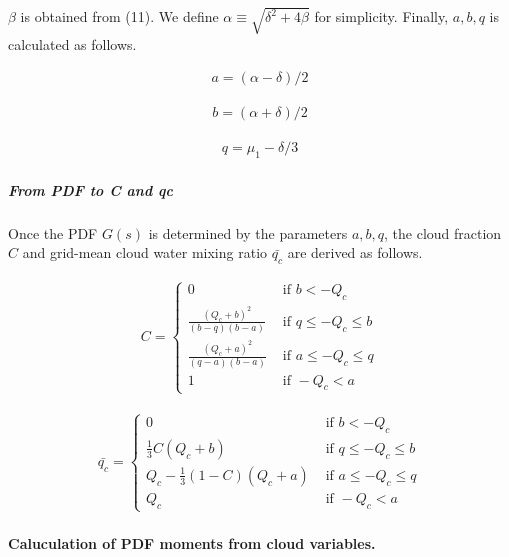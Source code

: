 \(\beta\) is obtained from (11). We define
\(\alpha \equiv\sqrt{\delta^{2}+4 \beta}\) for simplicity. Finally,
\(a,b,q\) is calculated as follows.

\begin{eqnarray}
a=(\alpha-\delta) / 2
\end{eqnarray}

\begin{eqnarray}
b=(\alpha+\delta) / 2
\end{eqnarray}

\begin{eqnarray}
q=\mu_{1}-\delta / 3
\end{eqnarray}

\hypertarget{from-pdf-to-c-and-qc}{%
\subparagraph{From PDF to C and qc}\label{from-pdf-to-c-and-qc}}

Once the PDF \(G(s)\) is determined by the parameters \(a,b,q\), the
cloud fraction \(C\) and grid-mean cloud water mixing ratio
\(\bar{q_c}\) are derived as follows.

\begin{eqnarray}
C=\left\{\begin{array}{ll}
0 & \text { if } b<-Q_{c} \\
\frac{\left(Q_{c}+b\right)^{2}}{(b-q)(b-a)} & \text { if } q \leq-Q_{c} \leq b \\
\frac{\left(Q_{c}+a\right)^{2}}{(q-a)(b-a)} & \text { if } a \leq-Q_{c} \leq q \\
1 & \text { if }-Q_{c}<a
\end{array}\right.
\label{E08-15}
\end{eqnarray}

\begin{eqnarray}
\bar{q_c}=\left\{\begin{array}{ll}
0 & \text { if } b<-Q_{c} \\
\frac{1}{3} C\left(Q_{c}+b\right) & \text { if } q \leq-Q_{c} \leq b \\
Q_{c}-\frac{1}{3}(1-C)\left(Q_{c}+a\right) & \text { if } a \leq-Q_{c} \leq q \\
Q_{c} & \text { if }-Q_{c}<a
\end{array}\right.
\label{E08-16}
\end{eqnarray}

\hypertarget{caluculation-of-pdf-moments-from-cloud-variables.}{%
\paragraph{Caluculation of PDF moments from cloud
variables.}\label{caluculation-of-pdf-moments-from-cloud-variables.}}

